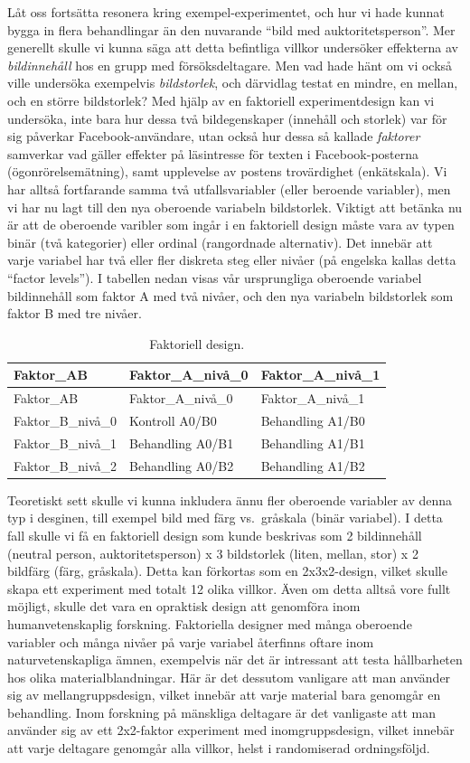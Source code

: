 \documentclass[
]{book}
\begin{document}
Låt oss fortsätta resonera kring exempel-experimentet, och hur vi hade kunnat bygga in flera behandlingar än den nuvarande ``bild med auktoritetsperson''. Mer generellt skulle vi kunna säga att detta befintliga villkor undersöker effekterna av \emph{bildinnehåll} hos en grupp med försöksdeltagare. Men vad hade hänt om vi också ville undersöka exempelvis \emph{bildstorlek}, och därvidlag testat en mindre, en mellan, och en större bildstorlek? Med hjälp av en faktoriell experimentdesign kan vi undersöka, inte bara hur dessa två bildegenskaper (innehåll och storlek) var för sig påverkar Facebook-användare, utan också hur dessa så kallade \emph{faktorer} samverkar vad gäller effekter på läsintresse för texten i Facebook-posterna (ögonrörelsemätning), samt upplevelse av postens trovärdighet (enkätskala). Vi har alltså fortfarande samma två utfallsvariabler (eller beroende variabler), men vi har nu lagt till den nya oberoende variabeln bildstorlek. Viktigt att betänka nu är att de oberoende varibler som ingår i en faktoriell design måste vara av typen binär (två kategorier) eller ordinal (rangordnade alternativ). Det innebär att varje variabel har två eller fler diskreta steg eller nivåer (på engelska kallas detta ``factor levels''). I tabellen nedan visas vår ursprungliga oberoende variabel bildinnehåll som faktor A med två nivåer, och den nya variabeln bildstorlek som faktor B med tre nivåer.

\begin{longtable}[]{@{}lll@{}}
\caption{\label{tab:tab-02-07-5-6-01}Faktoriell design.}\tabularnewline
\toprule
Faktor\_AB & Faktor\_A\_nivå\_0 & Faktor\_A\_nivå\_1\tabularnewline
\midrule
\endfirsthead
\toprule
Faktor\_AB & Faktor\_A\_nivå\_0 & Faktor\_A\_nivå\_1\tabularnewline
\midrule
\endhead
Faktor\_B\_nivå\_0 & Kontroll A0/B0 & Behandling A1/B0\tabularnewline
Faktor\_B\_nivå\_1 & Behandling A0/B1 & Behandling A1/B1\tabularnewline
Faktor\_B\_nivå\_2 & Behandling A0/B2 & Behandling A1/B2\tabularnewline
\bottomrule
\end{longtable}

Teoretiskt sett skulle vi kunna inkludera ännu fler oberoende variabler av denna typ i desginen, till exempel bild med färg vs.~gråskala (binär variabel). I detta fall skulle vi få en faktoriell design som kunde beskrivas som 2 bildinnehåll (neutral person, auktoritetsperson) x 3 bildstorlek (liten, mellan, stor) x 2 bildfärg (färg, gråskala). Detta kan förkortas som en 2x3x2-design, vilket skulle skapa ett experiment med totalt 12 olika villkor. Även om detta alltså vore fullt möjligt, skulle det vara en opraktisk design att genomföra inom humanvetenskaplig forskning. Faktoriella designer med många oberoende variabler och många nivåer på varje variabel återfinns oftare inom naturvetenskapliga ämnen, exempelvis när det är intressant att testa hållbarheten hos olika materialblandningar. Här är det dessutom vanligare att man använder sig av mellangruppsdesign, vilket innebär att varje material bara genomgår en behandling. Inom forskning på mänskliga deltagare är det vanligaste att man använder sig av ett 2x2-faktor experiment med inomgruppsdesign, vilket innebär att varje deltagare genomgår alla villkor, helst i randomiserad ordningsföljd.
\end{document}
